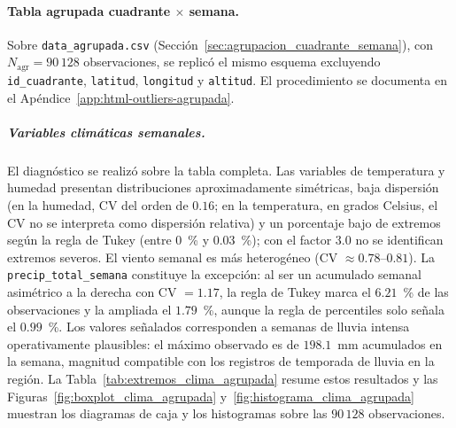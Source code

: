     
    
    \paragraph{Tabla agrupada cuadrante $\times$ semana.} Sobre \texttt{data\_agrupada.csv} (Sección~\ref{sec:agrupacion_cuadrante_semana}), con $N_{\mathrm{agr}} = 90\,128$ observaciones, se replicó el mismo esquema excluyendo \texttt{id\_cuadrante}, \texttt{latitud}, \texttt{longitud} y \texttt{altitud}. El procedimiento se documenta en el Apéndice~\ref{app:html-outliers-agrupada}.
    
    \subparagraph{Variables climáticas semanales.} El diagnóstico se realizó sobre la tabla completa. Las variables de temperatura y humedad presentan distribuciones aproximadamente simétricas, baja dispersión (en la humedad, CV del orden de $0{.}16$; en la temperatura, en grados Celsius, el CV no se interpreta como dispersión relativa) y un porcentaje bajo de extremos según la regla de Tukey (entre $0$~\% y $0{.}03$~\%); con el factor $3{.}0$ no se identifican extremos severos. El viento semanal es más heterogéneo (CV $\approx 0{.}78$--$0{.}81$). La \texttt{precip\_total\_semana} constituye la excepción: al ser un acumulado semanal asimétrico a la derecha con CV $= 1{.}17$, la regla de Tukey marca el $6{.}21$~\% de las observaciones y la ampliada el $1{.}79$~\%, aunque la regla de percentiles solo señala el $0{.}99$~\%. Los valores señalados corresponden a semanas de lluvia intensa operativamente plausibles: el máximo observado es de $198{.}1$~mm acumulados en la semana, magnitud compatible con los registros de temporada de lluvia en la región. La Tabla~\ref{tab:extremos_clima_agrupada} resume estos resultados y las Figuras~\ref{fig:boxplot_clima_agrupada} y~\ref{fig:histograma_clima_agrupada} muestran los diagramas de caja y los histogramas sobre las $90\,128$ observaciones.
    
